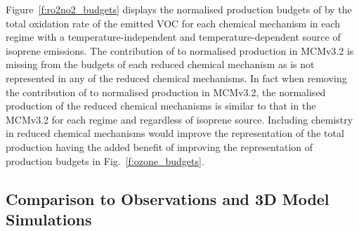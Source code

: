 Figure~\ref{f:ro2no2_budgets} displays the normalised production budgets of  by the total oxidation rate of the emitted VOC for each chemical mechanism in each  regime with a temperature-independent and temperature-dependent source of isoprene emissions.
The contribution of  to normalised  production in MCMv3.2 is missing from the budgets of each reduced chemical mechanism as  is not represented in any of the reduced chemical mechanisms.
In fact when removing the contribution of  to normalised  production in MCMv3.2, the normalised  production of the reduced chemical mechanisms is similar to that in the MCMv3.2 for each  regime and regardless of isoprene source.
Including  chemistry in reduced chemical mechanisms would improve the representation of the total  production having the added benefit of improving the representation of  production budgets in Fig.~\ref{f:ozone_budgets}.

\subsection{Comparison to Observations and 3D Model Simulations} \label{ss:r_observations}

